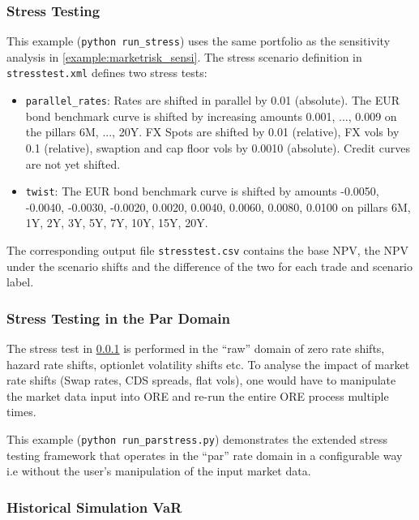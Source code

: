 \subsubsection{Stress Testing}
\label{example:marketrisk_stress}

This example ({\tt python run\_stress}) uses the same portfolio as the sensitivity analysis in
\ref{example:marketrisk_sensi}.  The stress scenario definition in {\tt stresstest.xml} defines two
stress tests:

\begin{itemize}
\item {\tt parallel\_rates}: Rates are shifted in parallel by 0.01 (absolute). The EUR bond benchmark curve is shifted by
  increasing amounts 0.001, ..., 0.009 on the pillars 6M, ..., 20Y. FX Spots are shifted by 0.01 (relative), FX vols by
  0.1 (relative), swaption and cap floor vols by 0.0010 (absolute).
  Credit curves are not yet shifted.
\item {\tt twist}: The EUR bond benchmark curve is shifted by amounts -0.0050, -0.0040, -0.0030, -0.0020, 0.0020,
  0.0040, 0.0060, 0.0080, 0.0100 on pillars 6M, 1Y, 2Y, 3Y, 5Y, 7Y, 10Y, 15Y, 20Y.
\end{itemize}

The corresponding output file {\tt stresstest.csv} contains the base NPV, the NPV under the scenario shifts and the
difference of the two for each trade and scenario label.

\subsubsection{Stress Testing in the Par Domain}
\label{example:marketrisk_parstress}

The stress test in \ref{example:marketrisk_stress} is performed in the ``raw'' domain
of zero rate shifts, hazard rate shifts, optionlet volatility shifts etc.
To analyse the impact of market rate shifts (Swap rates, CDS spreads, flat vols), one would have to
manipulate the market data input into ORE and re-run the entire ORE process multiple times.

This example ({\tt python run\_parstress.py}) demonstrates the extended
stress testing framework that operates in the ``par'' rate domain in a configurable way i.e without
the user's manipulation of the input market data.

\subsubsection{Historical Simulation VaR}
\label{example:marketrisk_histsim}

